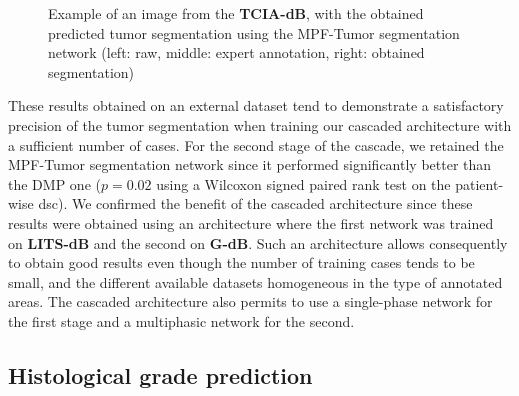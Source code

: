 \documentclass[]{article}
\newcommand{\pplfont}[1]{{\fontfamily{ppl}\selectfont #1}}
\newcommand{\lmttfont}[1]{{\fontfamily{lmtt}\selectfont #1}}
\begin{document}
\begin{figure}[ht!]
\begin{minipage}{0.3\linewidth}
	\end{minipage}
	\caption{Example of an image from the \textbf{\lmttfont{TCIA-dB}}, with the obtained predicted tumor segmentation using the \pplfont{MPF-Tumor} segmentation network (left: raw, middle: expert annotation, right: obtained segmentation)}
	\label{fig:TCIAMultiphaseTumorPred}
\end{figure}

These results obtained on an external dataset tend to demonstrate a satisfactory precision
of the tumor segmentation when training our cascaded architecture with a
sufficient number of cases.
For the second stage of the cascade, we retained the \pplfont{MPF-Tumor} segmentation network since it performed
significantly better than the \pplfont{DMP} one ($ p = 0.02 $ using a Wilcoxon signed
paired rank test on the patient-wise \ac{dsc}).
We confirmed the benefit of the cascaded architecture since these results
were obtained using an architecture where the first network was trained
on \textbf{\lmttfont{LITS-dB}} and the second on \textbf{\lmttfont{G-dB}}. Such an architecture allows consequently to obtain good results even though the number of training cases tends to be small, and the different available datasets homogeneous in the type of annotated areas. The cascaded architecture also permits to use a single-phase network for the first stage and a multiphasic network for the second.

\subsection{Histological grade prediction}
\end{document}
